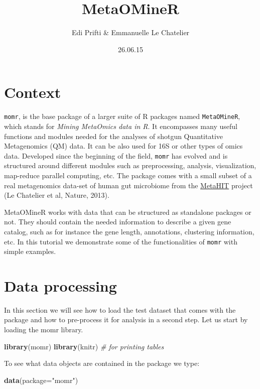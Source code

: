 \documentclass[]{article}
\title{MetaOMineR}
\author{Edi Prifti \& Emmanuelle Le Chatelier}
\date{26.06.15}
\newenvironment{Shaded}{\begin{snugshade}}{\end{snugshade}}
\newcommand{\KeywordTok}[1]{\textcolor[rgb]{0.13,0.29,0.53}{\textbf{{#1}}}}
\newcommand{\DataTypeTok}[1]{\textcolor[rgb]{0.13,0.29,0.53}{{#1}}}
\newcommand{\StringTok}[1]{\textcolor[rgb]{0.31,0.60,0.02}{{#1}}}
\newcommand{\CommentTok}[1]{\textcolor[rgb]{0.56,0.35,0.01}{\textit{{#1}}}}
\newcommand{\NormalTok}[1]{{#1}}
\begin{document}
\maketitle

{
\setcounter{tocdepth}{3}
\tableofcontents
}
\section{Context}\label{context}

\texttt{momr}, is the base package of a larger suite of R packages named
\texttt{MetaOMineR}, which stands for \emph{Mining MetaOmics data in R}.
It encompasses many useful functions and modules needed for the analyses
of shotgun Quantitative Metagenomics (QM) data. It can be also used for
16S or other types of omics data. Developed since the beginning of the
field, \texttt{momr} has evolved and is structured around different
modules such as preprocessing, analysis, visualization, map-reduce
parallel computing, etc. The package comes with a small subset of a real
metagenomics data-set of human gut microbiome from the
\href{http://metahit.eu}{MetaHIT} project (Le Chatelier et al, Nature,
2013).

MetaOMineR works with data that can be structured as standalone packages
or not. They should contain the needed information to describe a given
gene catalog, such as for instance the gene length, annotations,
clustering information, etc. In this tutorial we demonstrate some of the
functionalities of \texttt{momr} with simple examples.

\section{Data processing}\label{data-processing}

In this section we will see how to load the test dataset that comes with
the package and how to pre-process it for analysis in a second step. Let
us start by loading the momr library.

\begin{Shaded}
\begin{Highlighting}[]
\KeywordTok{library}\NormalTok{(momr)}
\KeywordTok{library}\NormalTok{(knitr) }\CommentTok{# for printing tables}
\end{Highlighting}
\end{Shaded}

To see what data objects are contained in the package we type:

\begin{Shaded}
\begin{Highlighting}[]
\KeywordTok{data}\NormalTok{(}\DataTypeTok{package=}\StringTok{"momr"}\NormalTok{)}
\end{Highlighting}
\end{Shaded}
\end{document}

